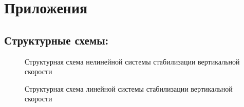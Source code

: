 \newpage
\begin{center}
    \label{}
    \section*{Приложения}
\end{center}

\subsection*{Структурные схемы:}

\begin{figure}[H]
    \caption{Структурная схема нелинейной системы стабилизации вертикальной скорости}
    \label{fig:Нелинейгая схема}
\end{figure}

\begin{figure}[H]
    \caption{Структурная схема линейной системы стабилизации вертикальной скорости}
    \label{fig:Линейная схема}
\end{figure}
